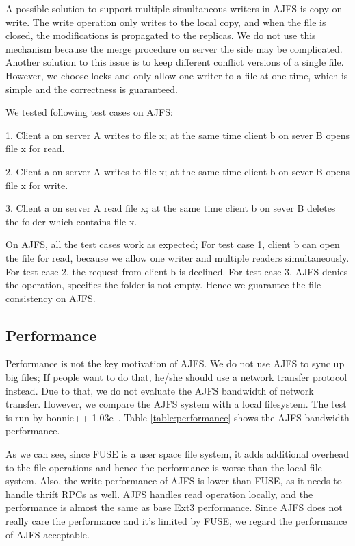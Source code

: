 A possible solution to support multiple simultaneous writers in AJFS is copy on write. The write operation only writes to the local copy, and when the file is closed, the modifications is propagated to the replicas. We do not use this mechanism because the merge procedure on server the side may be complicated. Another solution to this issue is to keep different conflict versions of a single file. 
However, we choose locks and only allow one writer to a file at one time, which is simple and the correctness is guaranteed.

We tested following test cases on AJFS:

1. Client a on server A writes to file x; at the same time client b on sever B opens file x for read.

2. Client a on server A writes to file x; at the same time client b on sever B opens file x for write.

3. Client a on server A read file x; at the same time client b on sever B deletes the folder which contains file x.

On AJFS, all the test cases work as expected; For test case 1, client b can open the file for read, because we allow one writer and multiple readers simultaneously. For test case 2, the request from client b is declined. For test case 3, AJFS denies the operation, specifies the folder is not empty. Hence we guarantee the file consistency on AJFS.

\subsection{Performance}

Performance is not the key motivation of AJFS. We do not use AJFS to sync up big files; If people want to do that, he/she should use a network transfer protocol instead. Due to that, we do not evaluate the AJFS bandwidth of network transfer.
However, we compare the AJFS system with a local filesystem. The test is run by bonnie++ 1.03e~\cite{bonnie++}. Table \ref{table:performance} shows the AJFS bandwidth performance. 

As we can see, since FUSE is a user space file system, it adds additional overhead to the file operations and hence the performance is worse than the local file system.
Also, the write performance of AJFS is lower than FUSE, as it needs to handle thrift RPCs as well. AJFS handles read operation locally, and the performance is almost the same as base Ext3 performance.
Since AJFS does not really care the performance and it's limited by FUSE, we regard the performance of AJFS acceptable. 


